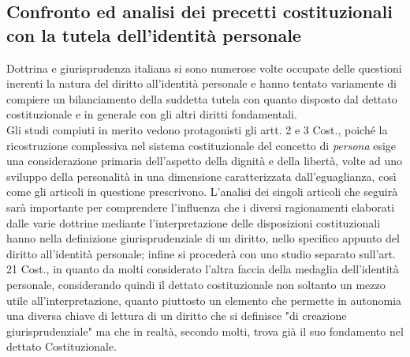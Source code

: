 \subsection{Confronto ed analisi dei precetti costituzionali con la tutela dell'identità personale}
Dottrina e giurisprudenza italiana si sono numerose volte occupate delle questioni inerenti la natura del diritto all'identità personale e hanno tentato variamente di compiere un bilanciamento della suddetta tutela con quanto disposto dal dettato costituzionale e in generale con gli altri diritti fondamentali.
\\Gli studi compiuti in merito vedono protagonisti gli artt. 2 e 3 Cost., poiché la ricostruzione complessiva nel sistema costituzionale del concetto di \textit{persona} esige una considerazione primaria dell'aspetto della dignità e della libertà, volte ad uno sviluppo della personalità in una dimensione caratterizzata dall'eguaglianza, così come gli articoli in questione prescrivono.
L'analisi dei singoli articoli che seguirà sarà importante per comprendere l'influenza che i diversi ragionamenti elaborati dalle varie dottrine mediante l'interpretazione delle disposizioni costituzionali hanno nella definizione giurisprudenziale di un diritto, nello specifico appunto del diritto all'identità personale; infine si procederà con uno studio separato sull'art. 21 Cost., in quanto da molti considerato l'altra faccia della medaglia dell'identità personale, considerando quindi il dettato costituzionale non soltanto un mezzo utile all'interpretazione, quanto piuttosto un elemento che permette in autonomia una diversa chiave di lettura di un diritto che si definisce "di creazione giurisprudenziale" ma che in realtà, secondo molti, trova già il suo fondamento nel dettato Costituzionale.

